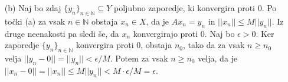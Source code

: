 \documentclass[a4paper, 12pt]{article}
\newcommand{\N}{\mathbb{N}}
\begin{document}
\begin{enumerate}
\item[(b)] Naj bo zdaj $\{y_n\}_{n\in \N} \subseteq Y$ poljubno zaporedje, ki konvergira proti  0. Po točki (a) za vsak $n\in \N$ obstaja $x_n\in X$, da je $Ax_n = y_n$ in $||x_n|| \le M ||y_n||$. Iz druge neenakosti pa sledi še, da $x_n$ konvergirajo proti 0. Naj bo $\epsilon >0$. Ker zaporedje $\{y_n\}_{n\in\N}$ konvergira proti 0, obstaja $n_0$, tako da za vsak $n\ge n_0$ velja $||y_n - 0|| = ||y_n|| < \epsilon / M$. Potem za vsak $n \ge n_0$ velja, da je $||x_n - 0|| = ||x_n||  \le M ||y_n|| < M \cdot \epsilon/M = \epsilon$.
\end{enumerate}
\end{document}
